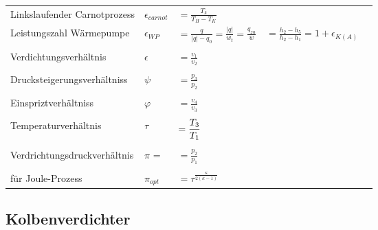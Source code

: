 \documentclass[twocolumn]{article}
\begin{document}
\begin{tabular}{lllll}
	Linkslaufender Carnotprozess &
	$\epsilon_{carnot}$ &$\displaystyle = \frac{T_k}{T_H-T_K}$ \\
	Leistungszahl Wärmepumpe &
	$\epsilon_{WP}$ & $\displaystyle = \frac{q}{|q| - q_0} = \frac{|q|}{w_t} = \frac{q_{zu}}{w}$ &$\displaystyle = \frac{h_2 - h_5}{h_2 - h_1} = 1 + \epsilon_{K(A)}$ \\\\
	Verdichtungsverhältnis &
	$\epsilon$ &$\displaystyle = \frac{v_1}{v_2}$ \\\\
	Drucksteigerungsverhältniss &
	$\psi$ &$\displaystyle = \frac{p_3}{p_2}$ \\\\
	Einspriztverhältniss &
	$\varphi $ &$\displaystyle = \frac{v_4}{v_3}$ \\\\
	Temperaturverhältnis &
	$\tau$ &$ \displaystyle \displaystyle =\frac{T_3}{T_1}$ \\\\
	Verdrichtungsdruckverhältnis &
	$\pi$ = & $ \displaystyle  = \frac{p_2}{p_1}$ \\\\
	für Joule-Prozess &
	$\pi_{opt}$ & $ \displaystyle = \tau^{\frac{\kappa}{2(\kappa -1)}}$ \\
	
	
\end{tabular}

\pagebreak

%
%
%
%
%
%
%
%	

\subsection*{Kolbenverdichter}
\end{document}

